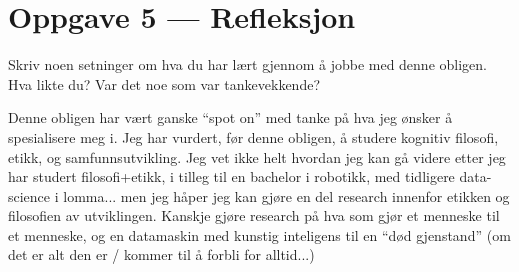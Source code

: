 \documentclass{../../myassignment}
\begin{document}
\section*{Oppgave 5 --- Refleksjon}
	\begin{problem}
		Skriv noen setninger om hva du har lært gjennom å jobbe med denne obligen. Hva likte du? Var det noe som var tankevekkende?
	\end{problem}

	\begin{answer}
		Denne obligen har vært ganske ``spot on'' med tanke på hva jeg ønsker å spesialisere meg i. Jeg har vurdert, før denne obligen, å studere kognitiv filosofi, etikk, og samfunnsutvikling. Jeg vet ikke helt hvordan jeg kan gå videre etter jeg har studert filosofi+etikk, i tilleg til en bachelor i robotikk, med tidligere data-science i lomma... men jeg håper jeg kan gjøre en del research innenfor etikken og filosofien av utviklingen. Kanskje gjøre research på hva som gjør et menneske til et menneske, og en datamaskin med kunstig inteligens til en ``død gjenstand'' (om det er alt den er / kommer til å forbli for alltid...)

	\end{answer}
\end{document}
